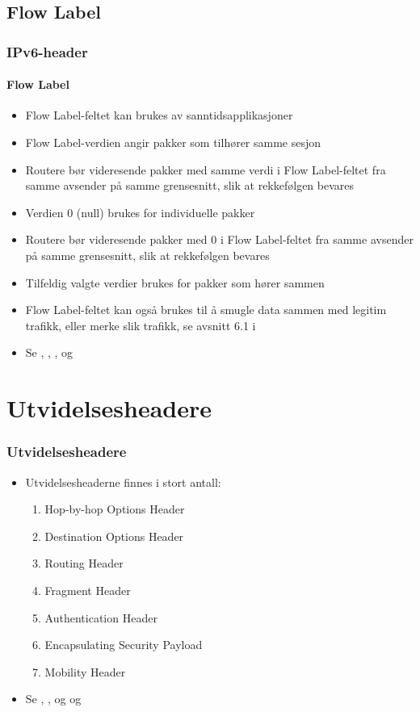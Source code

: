\subsection{Flow Label}
\begin{frame}
  \frametitle{IPv6-header}
  \framesubtitle{Flow Label}
  \begin{itemize}
  \item Flow Label-feltet kan brukes av sanntidsapplikasjoner
  \item Flow Label-verdien angir pakker som tilhører samme sesjon
  \item Routere bør videresende pakker med samme verdi i Flow
    Label-feltet fra samme avsender på samme grensesnitt, slik at
    rekkefølgen bevares
  \item Verdien 0 (null) brukes for individuelle pakker
  \item Routere bør videresende pakker med 0 i Flow Label-feltet fra
    samme avsender på samme grensesnitt, slik at rekkefølgen bevares
  \item Tilfeldig valgte verdier brukes for pakker som hører sammen
  \item Flow Label-feltet kan også brukes til å smugle data sammen med
    legitim trafikk, eller merke slik trafikk, se avsnitt 6.1 i
  \item Se , , ,  og 
  \end{itemize}
\end{frame}

\section{Utvidelsesheadere}
\begin{frame}
  \frametitle{Utvidelsesheadere}
  \begin{itemize}
  \item Utvidelsesheaderne finnes i stort antall:
    \begin{enumerate}
    \item Hop-by-hop Options Header
    \item Destination Options Header
    \item Routing Header
    \item Fragment Header
    \item Authentication Header
    \item Encapsulating Security Payload
    \item Mobility Header
    \end{enumerate}
  \item Se , ,  og  og
  \end{itemize}
\end{frame}


